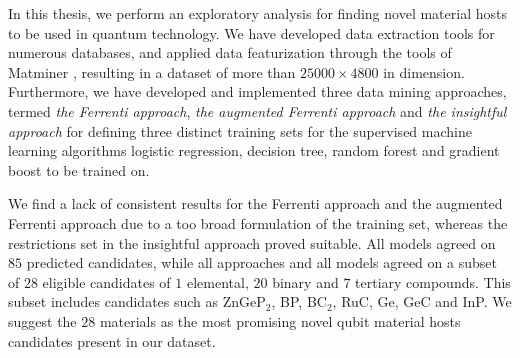 In this thesis, we perform an exploratory analysis for finding novel material hosts to be used in quantum technology. We have developed data extraction tools for numerous databases, and applied data featurization through the tools of Matminer \cite{Ward2018}, resulting in a dataset of more than $25000\times4800$ in dimension. Furthermore, we have developed and implemented three data mining approaches, termed \textit{the Ferrenti approach}, \textit{the augmented Ferrenti approach} and \textit{the insightful approach} for defining three distinct training sets for the supervised machine learning algorithms logistic regression, decision tree, random forest and gradient boost to be trained on.

We find a lack of consistent results for the Ferrenti approach and the augmented Ferrenti approach due to a too broad formulation of the training set, whereas the restrictions set in the insightful approach proved suitable. All models agreed on $85$ predicted candidates, while all approaches and all models agreed on a subset of $28$ eligible candidates of $1$ elemental, $20$ binary and $7$ tertiary compounds. This subset includes candidates such as ZnGeP$_2$, BP, BC$_2$, RuC, Ge, GeC and InP. We suggest the $28$ materials as the most promising novel qubit material hosts candidates present in our dataset.
